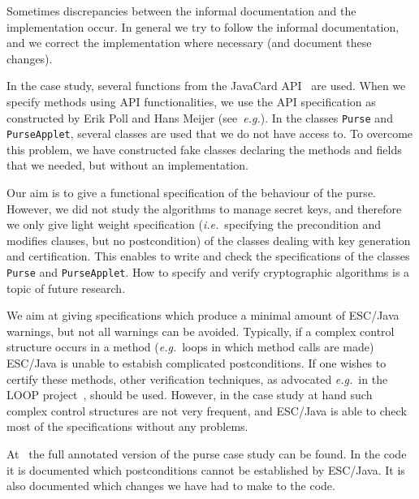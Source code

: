 \documentclass[a4paper]{llncs}
\begin{document}
Sometimes discrepancies between the informal documentation and the
implementation occur. In general we try to follow the informal
documentation, and we correct the implementation where necessary
(and document these changes). 

In the case study, several functions from the JavaCard
API~\cite{JavaCardAPI} are used. When we specify methods using API
functionalities, we use the API specification as constructed by Erik
Poll and Hans Meijer (see~\emph{e.g.}\cite{MeijerP01}).  In the
classes \texttt{Purse} and \texttt{PurseApplet}, several classes are
used that we do not have access to. To overcome this problem, we have
constructed fake classes declaring the methods and fields that we
needed, but without an implementation.

Our aim is to give a functional specification of the behaviour of the
purse. However, we did not study the algorithms to manage secret keys,
and therefore we only give light weight specification
(\emph{i.e.}~specifying the precondition and modifies clauses, but no
postcondition) of the classes dealing with key generation and
certification. This enables to write and check the specifications of
the classes \texttt{Purse} and \texttt{PurseApplet}. How to specify
and verify cryptographic algorithms is a topic of future research.

We aim at giving specifications which produce a minimal amount of
ESC/Java warnings, but not all warnings can be avoided. Typically, if
a complex control structure occurs in a method (\emph{e.g.}~loops in
which method calls are made) ESC/Java is unable to estabish
complicated postconditions. If one wishes to certify these methods,
other verification techniques, as advocated \emph{e.g.}~in the LOOP
project~\cite{LOOPUrl}, should be used. However, in the case study at
hand such complex control structures are not very frequent, and
ESC/Java is able to check most of the specifications without any
problems.

At~\cite{CatanoH01Url} the full annotated version of the purse case
study can be found. In the code it is documented which postconditions
cannot be established by ESC/Java. It is also documented which changes 
we have had to make to the code.
\end{document}
